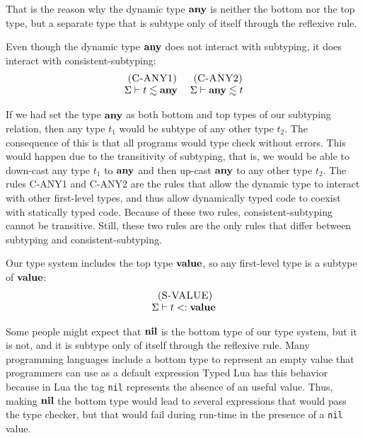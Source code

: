 That is the reason why the dynamic type $\mathbf{any}$ is neither the bottom nor the top type,
but a separate type that is subtype only of itself through the reflexive rule.

Even though the dynamic type $\mathbf{any}$ does not interact with subtyping,
it does interact with consistent-subtyping:
\[
\begin{array}{c}
\begin{array}{c}
\; (\textsc{C-ANY1})\\
\Sigma \vdash t \lesssim \mathbf{any}
\end{array}
\;
\begin{array}{c}
\; (\textsc{C-ANY2})\\
\Sigma \vdash \mathbf{any} \lesssim t
\end{array}
\end{array}
\]

If we had set the type $\mathbf{any}$ as both bottom and top types of our
subtyping relation, then any type $t_{1}$ would be subtype of
any other type $t_{2}$.
The consequence of this is that all programs would type check without errors.
This would happen due to the transitivity of subtyping, that is,
we would be able to down-cast any type $t_{1}$ to $\mathbf{any}$ and then up-cast
$\mathbf{any}$ to any other type $t_{2}$.
The rules \textsc{C-ANY1} and \textsc{C-ANY2} are the rules that
allow the dynamic type to interact with other first-level types,
and thus allow dynamically typed code to coexist with statically
typed code.
Because of these two rules, consistent-subtyping cannot be transitive.
Still, these two rules are the only rules that differ between
subtyping and consistent-subtyping.

Our type system includes the top type $\mathbf{value}$,
so any first-level type is a subtype of $\mathbf{value}$:
\[
\begin{array}{c}
\; (\textsc{S-VALUE})\\
\Sigma \vdash t <: \mathbf{value}
\end{array}
\]

Some people might expect that $\mathbf{nil}$ is the bottom type
of our type system, but it is not,
and it is subtype only of itself through the reflexive rule.
Many programming languages include a bottom type to represent
an empty value that programmers can use as a default expression
Typed Lua has this behavior because in Lua the tag \texttt{nil}
represents the absence of an useful value.
Thus, making $\mathbf{nil}$ the bottom type would lead to several expressions
that would pass the type checker, but that would fail during run-time
in the presence of a \texttt{nil} value.

